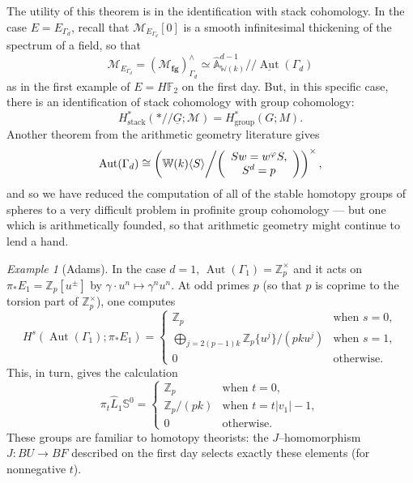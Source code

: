 \documentclass{amsart}
\newcommand{\Z}{\mathbb Z}
\renewcommand{\S}{\mathbb S}
\newcommand{\F}{\mathbb F}
\newcommand{\M}{\mathcal{M}}
\newcommand{\<}{\langle}
\renewcommand{\>}{\rangle}
\renewcommand{\phi}{\varphi}
\newcommand{\mmod}{/\!\!/}
\newcommand{\moduli}[1]{\mathcal{M}_{\mathbf{#1}}}
\theoremstyle{plain}
\theoremstyle{definition}
\theoremstyle{remark}
\newtheorem*{example}{Example}
\begin{document}
The utility of this theorem is in the identification with stack cohomology.  In the case $E = E_{\Gamma_d}$, recall that $\M_{E_{\Gamma_d}}[0]$ is a smooth infinitesimal thickening of the spectrum of a field, so that \[\M_{E_{\Gamma_d}} = \left( \moduli{fg} \right)^\wedge_{\Gamma_d} \simeq \widehat{\mathbb A}^{d-1}_{\mathbb W(k)} \mmod \underline{\operatorname{Aut}}(\Gamma_d)\] as in the first example of $E = H\F_2$ on the first day.  But, in this specific case, there is an identification of stack cohomology with group cohomology: \[H^*_{\mathrm{stack}}(* \mmod \underline{G}; \mathcal M) = H^*_{\mathrm{group}}(G; M).\]  Another theorem from the arithmetic geometry literature gives \[\operatorname{Aut}(\Gamma_d) \cong \left( \mathbb{W}(k)\langle S \rangle \middle/ \left( \begin{array}{c} Sw = w^\phi S, \\ S^d = p \end{array} \right) \right)^\times,\] and so we have reduced the computation of all of the stable homotopy groups of spheres to a very difficult problem in profinite group cohomology --- but one which is arithmetically founded, so that arithmetic geometry might continue to lend a hand.

\begin{example}[Adams]
In the case $d = 1$, $\operatorname{Aut}(\Gamma_1) = \Z_p^\times$ and it acts on $\pi_* E_1 = \Z_p[u^\pm]$ by $\gamma \cdot u^n \mapsto \gamma^n u^n$.  At odd primes $p$ (so that $p$ is coprime to the torsion part of $\Z_p^\times$), one computes \[H^s(\operatorname{Aut}(\Gamma_1); \pi_* E_1) = \begin{cases}\Z_p & \text{when $s = 0$}, \\ \bigoplus_{j = 2(p-1)k} \Z_p\{u^j\} / (pk u^j) & \text{when $s = 1$}, \\ 0 & \text{otherwise}. \end{cases}\]  This, in turn, gives the calculation \[\pi_t \widehat L_1 \S^0 = \begin{cases} \Z_p & \text{when $t = 0$}, \\ \Z_p / (pk) & \text{when $t = t|v_1| - 1$}, \\ 0 & \text{otherwise}. \end{cases}\]  These groups are familiar to homotopy theorists: the $J$--homomorphism $J: BU \to BF$ described on the first day selects exactly these elements (for nonnegative $t$).
\end{example}
\end{document}
